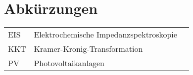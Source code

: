 \chapter*{Abkürzungen}\label{abkuerz}
\begin{longtable}[l]{p{0.2\tw} p{0.5\tw} p{0.1\tw}}
EIS     & Elektrochemische Impedanzspektroskopie                             \\
KKT	  & Kramer-Kronig-Transformation						     \\
PV	&	Photovoltaikanlagen 
\end{longtable}
